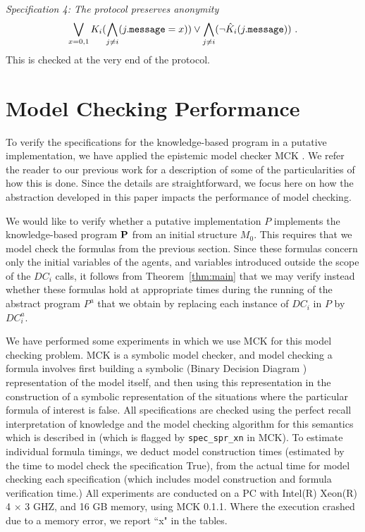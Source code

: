 \documentclass[]{llncs}
\newcommand{\msg}{{\tt message}}
\begin{document}
\textit{Specification 4:  The  protocol preserves anonymity}
$$  \bigvee_{x=0,1} K_i( \bigwedge_{j\neq i} (j.\msg = x)) \lor 
\bigwedge_{j\neq i} ( \neg \hat{K}_i(j.\msg))~.$$ 
This is checked at the very end of the protocol. 


\section{Model Checking Performance}\label{sec:results} 

To verify the specifications for the knowledge-based program in a putative implementation, 
we have applied  the epistemic model checker MCK \cite{mck}. We refer the reader to 
our previous work \cite{AlBatainehMeyden10} for a description of some 
of the particularities of how this is done. Since the details are straightforward, 
we focus here on how the abstraction developed in this paper 
impacts the performance of model checking. 

We would like to verify whether a putative implementation $P$ implements the knowledge-based program ${\bf P}$ 
from an initial structure $M_0$. This requires that we model check the formulas from the previous section. 
Since these formulas concern only the initial variables of the agents, and variables introduced outside
the scope of the $DC_i$ calls, it follows from Theorem~\ref{thm:main} that we may 
verify instead whether these formulas hold at appropriate times during the running of the 
abstract program $P^a$ that we obtain by replacing each instance of $DC_i$ in $P$ by $DC_i^a$. 

We have performed some experiments in which we use MCK for this model checking problem. 
MCK is a symbolic model checker, and model checking a formula 
involves first building a symbolic (Binary Decision Diagram \cite{Clarke99}) representation of the 
model itself, and then using this representation in the construction of a symbolic 
representation of the situations where the particular formula of interest is false.  
All specifications are checked using  the perfect recall interpretation of knowledge
and the model checking algorithm for this semantics which is described in \cite{MS}
(which is flagged by {\tt spec\_spr\_xn} in MCK). 
To estimate individual formula timings, we deduct model construction times 
(estimated by the time to model check  the specification True), from the actual time for model checking each specification 
(which includes model construction and formula verification time.)  
All experiments are conducted on a PC with Intel(R) Xeon(R) 4 $\times$ 3 GHZ, and 16 GB memory,
using 
MCK 0.1.1. Where the execution crashed due to a memory error, we report ``x" in the tables.
  
\end{document}
